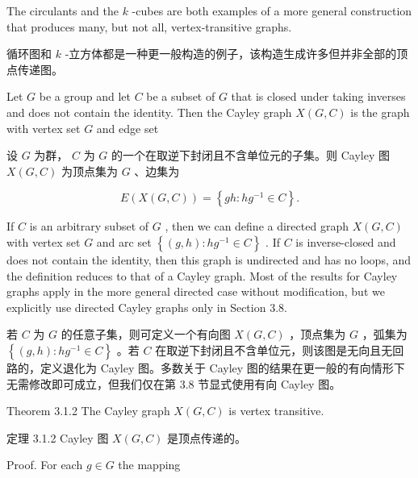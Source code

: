 \documentclass[10pt]{article}
\begin{document}
The circulants and the \(k\) -cubes are both examples of a more general construction that produces many, but not all, vertex-transitive graphs.

\begin{tcolorbox}\relax
循环图和 \(k\) -立方体都是一种更一般构造的例子，该构造生成许多但并非全部的顶点传递图。
\end{tcolorbox}

Let \(G\) be a group and let \(C\) be a subset of \(G\) that is closed under taking inverses and does not contain the identity. Then the Cayley graph \(X\left( {G,C}\right)\) is the graph with vertex set \(G\) and edge set

\begin{tcolorbox}\relax
设 \(G\) 为群， \(C\) 为 \(G\) 的一个在取逆下封闭且不含单位元的子集。则 Cayley 图 \(X\left( {G,C}\right)\) 为顶点集为 \(G\) 、边集为
\end{tcolorbox}

\[
E\left( {X\left( {G,C}\right) }\right)  = \left\{  {{gh} : h{g}^{-1} \in  C}\right\}  .
\]

If \(C\) is an arbitrary subset of \(G\) , then we can define a directed graph \(X\left( {G,C}\right)\) with vertex set \(G\) and arc set \(\left\{  {\left( {g,h}\right)  : h{g}^{-1} \in  C}\right\}\) . If \(C\) is inverse-closed and does not contain the identity, then this graph is undirected and has no loops, and the definition reduces to that of a Cayley graph. Most of the results for Cayley graphs apply in the more general directed case without modification, but we explicitly use directed Cayley graphs only in Section 3.8.

\begin{tcolorbox}\relax
若 \(C\) 为 \(G\) 的任意子集，则可定义一个有向图 \(X\left( {G,C}\right)\) ，顶点集为 \(G\) ，弧集为 \(\left\{  {\left( {g,h}\right)  : h{g}^{-1} \in  C}\right\}\) 。若 \(C\) 在取逆下封闭且不含单位元，则该图是无向且无回路的，定义退化为 Cayley 图。多数关于 Cayley 图的结果在更一般的有向情形下无需修改即可成立，但我们仅在第 3.8 节显式使用有向 Cayley 图。
\end{tcolorbox}

Theorem 3.1.2 The Cayley graph \(X\left( {G,C}\right)\) is vertex transitive.

\begin{tcolorbox}\relax
定理 3.1.2 Cayley 图 \(X\left( {G,C}\right)\) 是顶点传递的。
\end{tcolorbox}

Proof. For each \(g \in  G\) the mapping
\end{document}
